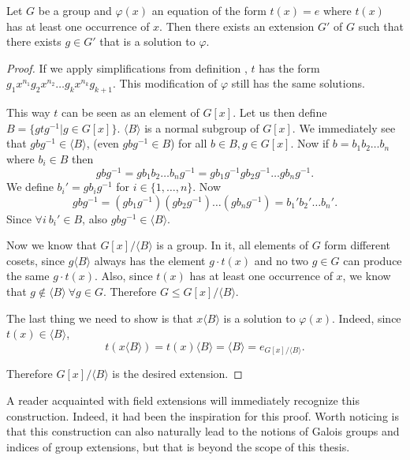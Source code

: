 \begin{thm}
	Let $G$ be a group and $\varphi(x)$ an equation of the form $t(x)=e$ where $t(x)$ has at least one occurrence of $x$. Then there exists an extension $G'$ of $G$ such that there exists $g\in G'$ that is a solution to $\varphi$.
\end{thm}
\begin{proof}
If we apply simplifications from definition , $t$ has the form $g_1 x^{n_1}g_2 x^{n_2}\dots g_k x^{n_k}g_{k+1}$. This modification of $\varphi$ still has the same solutions.

This way $t$ can be seen as an element of $G[x]$. Let us then define $B=\{gtg^{-1}|g\in G[x]\}$. $\langle B\rangle$ is a normal subgroup of $G[x]$. We immediately see that $gbg^{-1}\in \langle B\rangle$, (even $gbg^{-1}\in B$) for all $b\in B, g\in G[x]$. Now if $b=b_1 b_2\dots b_n$ where $b_i\in B$ then $$gbg^{-1}=gb_1 b_2\dots b_ng^{-1}=gb_1g^{-1}g b_2g^{-1}\dots gb_ng^{-1}.$$
We define ${b_i}'=gb_ig^{-1}$ for $i\in\{1,\dots,n\}$. Now $$gbg^{-1}=(gb_1g^{-1})(g b_2g^{-1})\dots (gb_ng^{-1})={b_1}'{b_2}'\dots{b_n}'.$$
Since $\forall i\ {b_i}'\in B$, also $gbg^{-1}\in \langle B\rangle$.

Now we know that $G[x]/\langle B \rangle$ is a group. In it, all elements of $G$ form different cosets, since $g\langle B \rangle$ always has the element $g\cdot t(x)$ and no two $g\in G$ can produce the same $g\cdot t(x)$. Also, since $t(x)$ has at least one occurrence of $x$, we know that $g\notin \langle B \rangle\ \forall g\in G$. Therefore $G\leq G[x]/\langle B \rangle$.

The last thing we need to show is that $x \langle B \rangle$ is a solution to $\varphi(x)$. Indeed, since $t(x)\in\langle B \rangle$, $$t(x\langle B \rangle)=t(x)\langle B \rangle=\langle B \rangle=e_{G[x]/\langle B \rangle}.$$

Therefore $G[x]/\langle B \rangle$ is the desired extension.
\end{proof}

A reader acquainted with field extensions will immediately recognize this construction. Indeed, it had been the inspiration for this proof. Worth noticing is that this construction can also naturally lead to the notions of Galois groups and indices of group extensions, but that is beyond the scope of this thesis.


